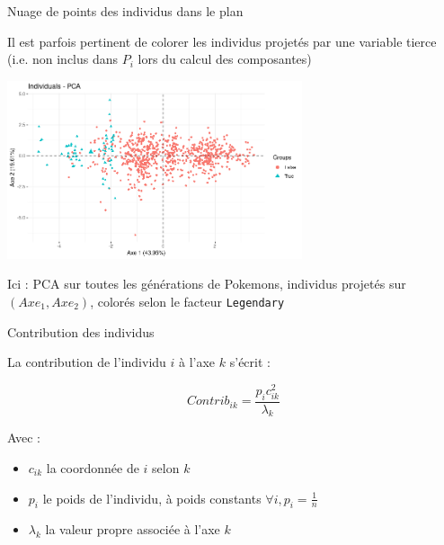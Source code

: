 \documentclass{beamer}
\begin{document}
\begin{frame}{Nuage de points des individus dans le plan}


Il est parfois pertinent de colorer les individus projetés par une variable tierce (i.e. non inclus dans $P_i$ lors du calcul des composantes)

\begin{center}
\includegraphics[width=0.65\textwidth,keepaspectratio]{img/exemple_2D_color_by_factor.png}
\end{center}
\begin{spacing}{0.7}


\begin{small}
Ici : PCA sur toutes les générations de Pokemons, individus projetés sur $(Axe_1, Axe_2 )$, colorés selon le facteur \texttt{Legendary}  
\end{small}

\end{spacing}

\end{frame}





\begin{frame}{Contribution des individus}

La \alert{contribution} de l'individu $i$ à l'axe $k$ s'écrit : 

$$Contrib_{ik}= \frac{p_ic_{ik}^2}{\lambda_k}$$


Avec : 
\begin{itemize}
\setlength\itemsep{-0.1em}
\item $c_{ik}$ la coordonnée de $i$ selon $k$
\item $p_i$ le poids de l'individu, à poids constants $\forall i, p_i=\frac{1}{n}$
\item $\lambda_k$ la valeur propre associée à l'axe $k$
\end{itemize}


\end{frame}
\end{document}

